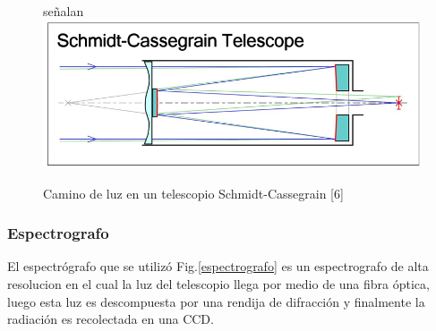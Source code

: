 \documentclass[Proceedings]{ascelike}
\begin{document}
\begin{figure}señalan
\centering
\includegraphics[scale=0.4]{SCT2.jpg}
\caption{Camino de luz en un telescopio Schmidt-Cassegrain [6] \label{la}}
\end{figure}


\subsubsection{Espectrografo}

El espectr\'ografo que se utiliz\'o Fig.\ref{espectrografo} es un espectrografo de alta resolucion en el cual la luz del telescopio llega por medio de una fibra \'optica, luego esta luz es descompuesta por una rendija de difracci\'on y finalmente la radiaci\'on es recolectada en una CCD.
\end{document}
